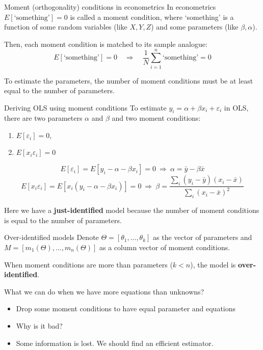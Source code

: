 \documentclass[handout]{beamer}
\begin{document}
\begin{frame}{Moment (orthogonality) conditions in econometrics}
In econometrics $E[\text{`something'}]=0$ is called a moment condition, where `something' is a function of some random variables (like $X,Y,Z$) and some parameters (like $\beta, \alpha$).\bigskip
\pause

Then, each moment condition is matched to its sample analogue:
\[E[\text{`something'}]=0\quad \Rightarrow \quad  \frac{1}{N}\sum_{i=1}^n\text{`something'}=0 \]
\pause

To estimate the parameters, the number of moment conditions must be at least equal to the number of parameters.\medskip

\end{frame}

\begin{frame}{Deriving OLS using moment conditions}
To estimate $y_i=\alpha+\beta x_i +\varepsilon_i$ in OLS, there are two parameters $\alpha$ and $\beta$ and two moment conditions:\pause
\begin{enumerate}
	\item $E[\varepsilon_i]=0,$
	\item $E[x_i\varepsilon_i]=0$
\end{enumerate}

\[E[\varepsilon_i]=E[y_i-\alpha-\beta x_i ]=0 \ \Rightarrow \ \alpha=\bar{y}-\beta \bar{x} \]
\[E[x_i\varepsilon_i]=E[x_i(y_i-\alpha-\beta x_i)]=0 \ \Rightarrow \ \beta=\frac{\sum_i(y_i-\bar{y})(x_i-\bar{x})}{\sum_i(x_i-\bar{x})^2}  \]


Here we have a \textbf{just-identified} model because the number of moment conditions is equal to the number of parameters.
\end{frame}


\begin{frame}{Over-identified models}
Denote $\Theta=[\theta_1,\dots,\theta_k]$ as the vector of parameters and $M=[m_1(\Theta),\dots,m_n(\Theta)]$ as a column vector of moment conditions.\bigskip

When moment conditions are more than parameters ($k<n$), the model is \textbf{over-identified}.\bigskip


What we can do when we have more equations than unknowns?\pause
\begin{itemize}[<+->]
	\item Drop some moment conditions to have equal parameter and equations
	\item Why is it bad? 
	\item Some information is lost. We should find an efficient estimator.
\end{itemize}
\end{frame}
\end{document}
